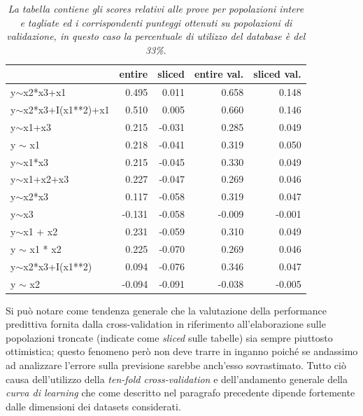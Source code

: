 \documentclass[12pt,openright,twoside,a4paper]{book}
\begin{document}
\begin{table}[!h]
\begin{tabular}{lrrrr}
\toprule
{} &  entire &  sliced &  entire val. &  sliced val. \\
\midrule
y$\sim$x2*x3+x1          &         0.495 &         0.011 &             0.658 &             0.148 \\
y$\sim$x2*x3+I(x1**2)+x1 &         0.510 &         0.005 &             0.660 &             0.146 \\
y$\sim$x1+x3             &         0.215 &        -0.031 &             0.285 &             0.049 \\
y $\sim$ x1              &         0.218 &        -0.041 &             0.319 &             0.050 \\
y$\sim$x1*x3             &         0.215 &        -0.045 &             0.330 &             0.049 \\
y$\sim$x1+x2+x3          &         0.227 &        -0.047 &             0.269 &             0.046 \\
y$\sim$x2*x3             &         0.117 &        -0.058 &             0.319 &             0.047 \\
y$\sim$x3                &        -0.131 &        -0.058 &            -0.009 &            -0.001 \\
y$\sim$x1 + x2           &         0.231 &        -0.059 &             0.310 &             0.049 \\
y $\sim$ x1 * x2         &         0.225 &        -0.070 &             0.269 &             0.046 \\
y$\sim$x2*x3+I(x1**2)    &         0.094 &        -0.076 &             0.346 &             0.047 \\
y $\sim$ x2              &        -0.094 &        -0.091 &            -0.038 &            -0.005 \\
\bottomrule
\end{tabular}
\caption{\textit{La tabella contiene gli scores relativi alle prove per popolazioni intere e tagliate ed i corrispondenti punteggi  ottenuti su popolazioni di validazione, in questo caso la percentuale di utilizzo del database è del 33\%}.}
\end{table}
\pagebreak

Si può notare come tendenza generale che la valutazione della performance predittiva fornita dalla cross-validation in riferimento all'elaborazione sulle popolazioni troncate (indicate come \textit{sliced} sulle tabelle) sia sempre piuttosto ottimistica; questo fenomeno però non deve trarre in inganno poiché se andassimo ad analizzare l'errore sulla previsione sarebbe anch'esso sovrastimato.
Tutto ciò causa dell'utilizzo della \textit{ten-fold cross-validation} e dell'andamento generale della \textit{ curva di learning} che come descritto nel paragrafo precedente dipende fortemente dalle dimensioni dei datasets considerati.
\end{document}
